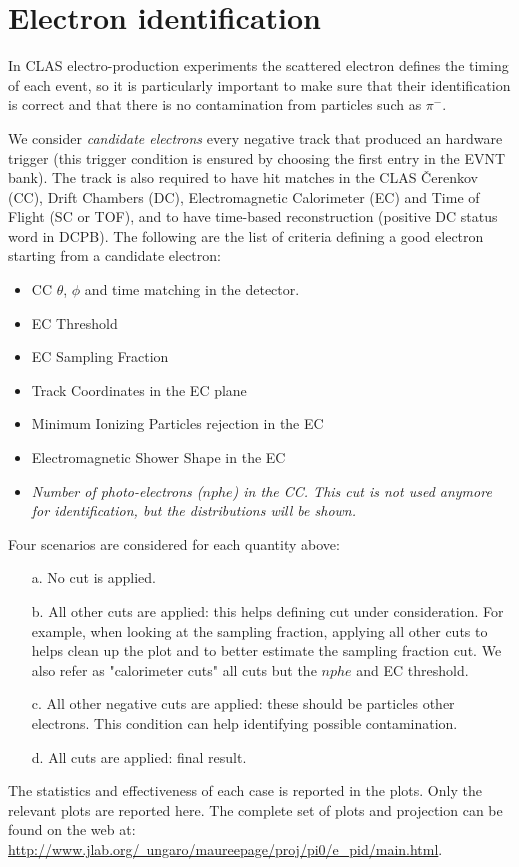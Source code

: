 \clearpage\newpage
\section{Electron identification}

In CLAS electro-production experiments
the scattered electron defines the timing of each event,
so it is particularly important to
make sure that their identification is correct and that
there is no contamination from particles such as $\pi^-$.

We consider {\it candidate electrons} every negative track
that produced an hardware trigger (this trigger condition is ensured by choosing
the first entry in the EVNT bank). The track is also required to have
hit matches in the CLAS \v Cerenkov (CC), Drift Chambers (DC),
Electromagnetic Calorimeter (EC) and Time of Flight (SC or TOF),
and to have time-based reconstruction (positive DC status word in DCPB).
The following are the list of criteria defining a good electron
starting from a candidate electron:

\begin{itemize}
	\item CC $\theta$, $\phi$ and time matching in the  detector.
	\item EC Threshold 
	\item EC Sampling Fraction 
	\item Track Coordinates in the EC plane 
	\item Minimum Ionizing Particles rejection in the EC
	\item Electromagnetic Shower Shape in the EC
	\item {\it Number of photo-electrons ($nphe$) in the CC.
              This cut is not used anymore for identification,
              but the distributions will be shown. }
\end{itemize}

Four scenarios are considered for each quantity above:

\begin{itemize}  
	\item[a.] No cut is applied.
	\item[b.] All other cuts are applied: this helps defining cut under consideration.
	      For example, when looking at the sampling fraction, applying all other
	      cuts to helps clean up the plot and to better estimate the sampling fraction
	      cut. We also refer as "calorimeter cuts" all cuts but the $nphe$ and EC threshold.
	\item[c.] All other negative cuts are applied: these should be particles other electrons. This
	      condition can help identifying possible contamination.
	\item[d.] All cuts are applied: final result.
\end{itemize}
The statistics and effectiveness of each case is reported in the plots.
Only the relevant plots are reported here. The complete set of plots and projection can
be found on the web at: \href{http://www.jlab.org/~ungaro/maureepage/proj/pi0/e_pid/main.html}
{http://www.jlab.org/~ungaro/maureepage/proj/pi0/e\_pid/main.html}.

